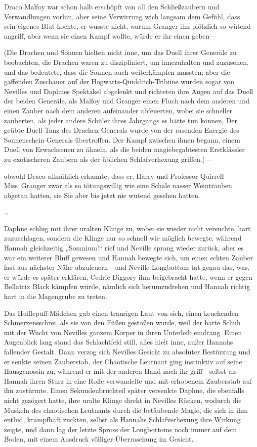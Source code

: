 {Draco Malfoy war schon halb erschöpft von all den Schließzaubern und Verwandlungen vorhin, aber seine Verwirrung wich langsam dem Gefühl, dass sein eigenes Blut kochte, er wusste nicht, warum Granger ihn plötzlich so wütend angriff, aber wenn sie einen Kampf wollte, würde er ihr einen geben—

(Die Drachen und Sonnen hielten nicht inne, um das Duell ihrer Generäle zu beobachten, die Drachen waren zu diszipliniert, um innezuhalten und zuzusehen, und das bedeutete, dass die Sonnen auch weiterkämpfen mussten; aber die gaffenden Zuschauer auf der Hogwarts-Quidditch-Tribüne wurden sogar von Nevilles und Daphnes Spektakel abgelenkt und richteten ihre Augen auf das Duell der beiden Generäle, als Malfoy und Granger einen Fluch nach dem anderen und einen Zauber nach dem anderen aufeinander abfeuerten, wobei sie schneller zauberten, als jeder andere Schüler ihres Jahrgangs es hätte tun können, Der geübte Duell-Tanz des Drachen-Generals wurde von der rasenden Energie des Sonnenschein-Generals übertroffen. Der Kampf zwischen ihnen begann, einem Duell von Erwachsenen zu ähneln, als die beiden magiebegabtesten Erstklässler zu exotischeren Zaubern als der üblichen Schlafverhexung griffen.)—

obwohl Draco allmählich erkannte, dass er, Harry und Professor Quirrell Miss~Granger zwar als so tötungswillig wie eine Schale nasser Weintrauben abgetan hatten, sie Sie aber bis jetzt nie wütend gesehen hatten.

…

Daphne schlug mit ihrer uralten Klinge zu, wobei sie wieder nicht versuchte, hart zuzuschlagen, sondern die Klinge nur so schnell wie möglich bewegte, während Hannah gleichzeitig „Somnium!“ rief und Neville sprang wieder zurück, aber es war ein weiterer Bluff gewesen und Hannah bewegte sich, um einen echten Zauber fast aus nächster Nähe abzufeuern - und Neville Longbottom tat genau das, was, er würde es später erklären, Cedric Diggory ihm beigebracht hatte, wenn er gegen Bellatrix Black kämpfen würde, nämlich sich herumzudrehen und Hannah richtig hart in die Magengrube zu treten.

Das Hufflepuff-Mädchen gab einen traurigen Laut von sich, einen keuchenden Schmerzensschrei, als sie von den Füßen gestoßen wurde, weil der harte Schuh mit der Wucht von Nevilles ganzem Körper in ihren Unterleib eindrang. Einen Augenblick lang stand das Schlachtfeld still, alles hielt inne, außer Hannahs fallender Gestalt. Dann verzog sich Nevilles Gesicht zu absoluter Bestürzung und er senkte seinen Zauberstab, der Chaotische Leutnant ging instinktiv auf seine Hausgenossin zu, während er mit der anderen Hand nach ihr griff - selbst als Hannah ihren Sturz in eine Rolle verwandelte und mit erhobenem Zauberstab auf ihn zustürmte. Einen Sekundenbruchteil später versenkte Daphne, die ebenfalls nicht gezögert hatte, ihre uralte Klinge direkt in Nevilles Rücken, wodurch die Muskeln des chaotischen Leutnants durch die betäubende Magie, die sich in ihm entlud, krampfhaft zuckten, selbst als Hannahs Schlafverhexung ihre Wirkung zeigte, und dann lag der letzte Spross der Longbottoms noch immer auf dem Boden, mit einem Ausdruck völliger Überraschung im Gesicht.

}
